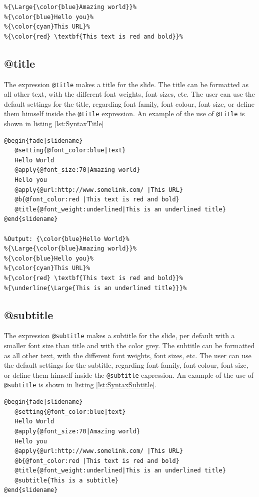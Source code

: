 {\begin{lstlisting}[frame=single, caption=Hello World with font weight, label=lst:SyntaxBUI]
%Output: {\color{blue}Hello World}%
%{\Large{\color{blue}Amazing world}}%
%{\color{blue}Hello you}%
%{\color{cyan}This URL}%
%{\color{red} \textbf{This text is red and bold}}%
\end{lstlisting}

\subsection{@title}
The expression \lstinline!@title! makes a title for the slide. The title can be formatted as all other text, with the different font weights, font sizes, etc. The user can use the default settings for the title, regarding font family, font colour, font size, or define them himself inside the \lstinline!@title! expression.
An example of the use of \lstinline!@title! is shown in listing \ref{lst:SyntaxTitle}

\begin{lstlisting}[frame=single, caption=Hello World with title, label=lst:SyntaxTitle]
@begin{fade|slidename}
   @setting{@font_color:blue|text}
   Hello World
   @apply{@font_size:70|Amazing world}
   Hello you
   @apply{@url:http://www.somelink.com/ |This URL}
   @b{@font_color:red |This text is red and bold}
   @title{@font_weight:underlined|This is an underlined title}
@end{slidename}

%Output: {\color{blue}Hello World}%
%{\Large{\color{blue}Amazing world}}%
%{\color{blue}Hello you}%
%{\color{cyan}This URL}%
%{\color{red} \textbf{This text is red and bold}}%
%{\underline{\Large{This is an underlined title}}}%
\end{lstlisting}


\subsection{@subtitle}
The expression \lstinline!@subtitle! makes a subtitle for the slide, per default with a smaller font size than title and with the color grey. The subtitle can be formatted as all other text, with the different font weights, font sizes, etc. The user can use the default settings for the subtitle, regarding font family, font colour, font size, or define them himself inside the \lstinline!@subtitle! expression.
An example of the use of \lstinline!@subtitle! is shown in listing \ref{lst:SyntaxSubtitle}.
\begin{lstlisting}[frame=single, caption=Hello World with subtitle, label=lst:SyntaxSubtitle]
@begin{fade|slidename}
   @setting{@font_color:blue|text}
   Hello World
   @apply{@font_size:70|Amazing world}
   Hello you
   @apply{@url:http://www.somelink.com/ |This URL}
   @b{@font_color:red |This text is red and bold}
   @title{@font_weight:underlined|This is an underlined title}
   @subtitle{This is a subtitle}
@end{slidename}


\end{lstlisting}}

